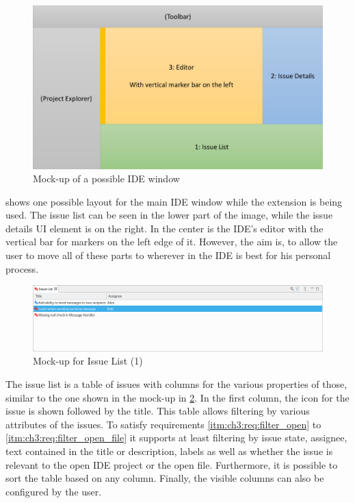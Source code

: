 \begin{figure}[!h]
	\centering
	\includegraphics[width=\textwidth]{graphics/mockOverview.pdf}
	\caption{Mock-up of a possible \gls{IDE} window}
	\label{fig:c3:mockup_overview}
\end{figure}
 shows one possible layout for the main \gls{IDE} window while the extension is being used.
The issue list can be seen in the lower part of the image, while the issue details \gls{UI} element is on the right.
In the center is the \gls{IDE}'s editor with the vertical bar for markers on the left edge of it.
However, the aim is, to allow the user to move all of these parts to wherever in the \gls{IDE} is best for his personal process.

\begin{figure}[!h]
	\centering
	\includegraphics[width=\textwidth]{graphics/concept_mockup_issueList.png}
	\caption{Mock-up for Issue List (1)}
	\label{fig:c3:mockup_issueList}
\end{figure}
The issue list is a table of issues with columns for the various properties of those, 
similar to the one shown in the mock-up in \cref{fig:c3:mockup_issueList}.
In the first column, the icon for the issue is shown followed by the title.
This table allows filtering by various attributes of the issues.
To satisfy requirements \ref{itm:ch3:req:filter_open} to \ref{itm:ch3:req:filter_open_file} it supports at least filtering
by issue state, assignee, text contained in the title or description, 
labels as well as whether the issue is relevant to the open \gls{IDE} project or the open file.
Furthermore, it is possible to sort the table based on any column. 
Finally, the visible columns can also be configured by the user.
\shortpage


